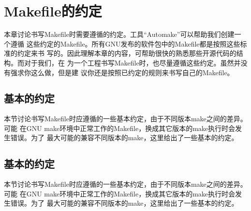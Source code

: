 ﻿\chapter{Makefile的约定}

本章讨论书写Makefile时需要遵循的约定。工具“Automake”可以帮助我们创建一个遵循
这些约定的Makefile。所有GNU发布的软件包中的Makefile都是按照这些标准的约定来书
写的。因此理解本章的内容，可帮助很快的熟悉那些开源代码的结构。而对于我们，在
为一个工程书写Makefile时，也尽量遵循这些约定。虽然并没有强求你这么做，但是建
议你还是按照已约定的规则来书写自己的Makefile。

\section{基本的约定}
本节讨论书写Makefile时应遵循的一些基本约定，由于不同版本make之间的差异。可能
在GNU make环境中正常工作的Makefile，换成其它版本的make执行时会发生错误。为了
最大可能的兼容不同版本的make，这里给出了一些基本的约定。

\section{基本的约定}
本节讨论书写Makefile时应遵循的一些基本约定，由于不同版本make之间的差异。可能
在GNU make环境中正常工作的Makefile，换成其它版本的make执行时会发生错误。为了
最大可能的兼容不同版本的make，这里给出了一些基本的约定。

